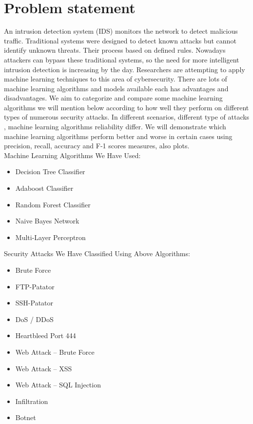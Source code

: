 \documentclass[submission,copyright,creativecommons]{eptcs}
\begin{document}
\section{Problem statement}
An intrusion detection system (IDS) monitors the network to detect malicious traffic. Traditional systems were designed to detect known attacks but cannot identify unknown threats. Their process based on defined rules. Nowadays attackers can bypass these traditional systems, so the need for more intelligent intrusion detection is increasing by the day. Researchers are attempting to apply machine learning techniques to this area of cybersecurity. There are lots of machine learning algorithms and models available each has advantages and disadvantages.
We aim to categorize and compare some machine learning algorithms we will mention below according to how well they perform on different types of numerous security attacks. In different scenarios, different type of attacks , machine learning algorithms reliability differ. We will demonstrate which machine learning algorithms perform better and worse in certain cases using precision, recall, accuracy and F-1 scores measures, also plots.\cite{b5}\\
\newpage
Machine Learning Algorithms We Have Used:
\begin{itemize}
  \item Decision Tree Classifier
  \item Adaboost Classifier
  \item Random Forest Classifier
  \item Naive Bayes Network
  \item Multi-Layer Perceptron
\end{itemize}

Security Attacks We Have Classified Using Above Algorithms:
\begin{itemize}
    \item Brute Force
    \item FTP-Patator
    \item SSH-Patator
    \item DoS / DDoS
    \item Heartbleed Port 444
    \item Web Attack – Brute Force
    \item Web Attack – XSS
    \item Web Attack – SQL Injection
    \item Infiltration
    \item Botnet

\end{itemize}
\end{document}
